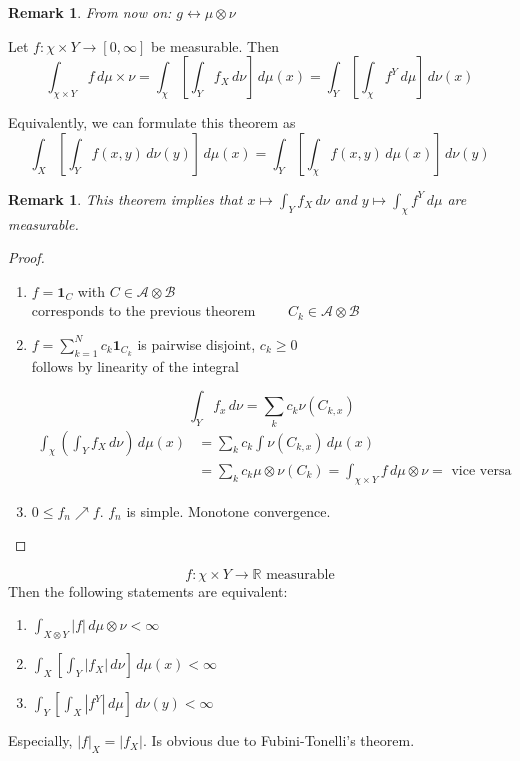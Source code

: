 \documentclass[a4paper]{article}
\newcounter{lecref}[section]
\numberwithin{lecref}{section}
\theoremstyle{break}
\newtheorem{remark}[lecref]{Remark}
\newtheorem*{Remark}{Remark}
\newcommand{\Abs}[1]{\left|#1\right|}
\begin{document}
\begin{Remark}
  From now on: $g \longleftrightarrow \mu \otimes \nu$
\end{Remark}

\begin{theorem}
  Let $f: \chi \times Y \to [0, \infty]$ be measurable. Then
  \[ \int_{\chi \times Y} f \, d\mu \times \nu = \int_\chi \left[\int_Y f_X \, d\nu\right] \, d\mu(x) = \int_Y \left[\int_\chi f^Y \, d\mu \right] \, d\nu(x) \]
\end{theorem}

Equivalently, we can formulate this theorem as
\[ \int_X \left[\int_Y f(x, y) \, d\nu(y)\right]\, d\mu(x) = \int_Y \left[\int_\chi f(x,y) \, d\mu(x)\right] \, d\nu(y) \]

\begin{remark}
  This theorem implies that $x \mapsto \int_Y f_X \, d\nu$ and $y \mapsto \int_\chi f^Y \, d\mu$ are measurable.
\end{remark}

\begin{proof}
  \begin{enumerate}
    \item $f = \mathbf{1}_C$ with $C \in \mathcal A \otimes \mathcal B$ \\
      corresponds to the previous theorem $\qquad C_k \in \mathcal A \otimes \mathcal B$
    \item $f = \sum_{k=1}^N c_k \mathbf{1}_{C_k}$ is pairwise disjoint, $c_k \geq 0$ \\
      follows by linearity of the integral

      \[ \int_Y f_x \, d\nu = \sum_k c_k \nu(C_{k,x}) \]
      \begin{align*}
        \int_\chi \left(\int_Y f_X \, d\nu\right) \, d\mu(x)
          &= \sum_k c_k \int \nu(C_{k,x}) \, d\mu(x) \\
          &= \sum_k c_k \mu \otimes \nu(C_k) = \int_{\chi \times Y} f \, d\mu \otimes \nu = \text{ vice versa}
      \end{align*}
    \item $0 \leq f_n \nearrow f$. $f_n$ is simple. Monotone convergence.
  \end{enumerate}
\end{proof}

\begin{theorem}[Fubini]
  \[ f: \chi \times Y \to \mathbb R \text{ measurable} \]
  Then the following statements are equivalent:
  \begin{enumerate}
    \item $\int_{X \otimes Y} \Abs{f} \, d\mu \otimes \nu < \infty$
    \item $\int_{X} \left[ \int_Y \Abs{f_X} \, d\nu \right] \, d\mu(x) < \infty$
    \item $\int_{Y} \left[ \int_{X} \Abs{f^Y} \, d\mu \right] \, d\nu(y) < \infty$
  \end{enumerate}
  Especially, $\Abs{f}_X = \Abs{f_X}$. Is obvious due to Fubini-Tonelli's theorem.
\end{theorem}
\end{document}
